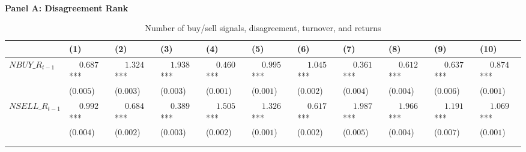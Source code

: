 
\begin{landscape}
\begin{table}



\caption[NBUY/NSELL, Disagreement, Turnover, and Returns]{\label{tab:num_buy_sell_reg}Number of buy/sell signals, disagreement, turnover, and returns}
\centering
\fontsize{9}{11}\selectfont
\begin{threeparttable}
\phantom{ }\\
\textbf{Panel A: Disagreement Rank}
\begin{tabular}[t]{>{\raggedright\arraybackslash}p{2.8cm}>{\raggedright\arraybackslash}p{1.7cm}>{\raggedright\arraybackslash}p{1.7cm}>{\raggedright\arraybackslash}p{1.7cm}>{\raggedright\arraybackslash}p{1.7cm}>{\raggedright\arraybackslash}p{1.7cm}>{\raggedright\arraybackslash}p{1.7cm}>{\raggedright\arraybackslash}p{1.7cm}>{\raggedright\arraybackslash}p{1.7cm}>{\raggedright\arraybackslash}p{1.7cm}>{\raggedright\arraybackslash}p{1.7cm}}
\toprule
 & \phantom{-}(1) & \phantom{-}(2) & \phantom{-}(3) & \phantom{-}(4) & \phantom{-}(5) & \phantom{-}(6) & \phantom{-}(7) & \phantom{-}(8) & \phantom{-}(9) & \phantom{-}(10)\\
\midrule
$NBUY\_R_{t-1}$ & $\phantom{-}0.687$*** & $\phantom{-}1.324$*** & $\phantom{-}1.938$*** & $\phantom{-}0.460$*** & $\phantom{-}0.995$*** & $\phantom{-}1.045$*** & $\phantom{-}0.361$*** & $\phantom{-}0.612$*** & $\phantom{-}0.637$*** & $\phantom{-}0.874$***\\
 & (\phantom{-}$0.005$) & (\phantom{-}$0.003$) & (\phantom{-}$0.003$) & (\phantom{-}$0.001$) & (\phantom{-}$0.001$) & (\phantom{-}$0.002$) & (\phantom{-}$0.004$) & (\phantom{-}$0.004$) & (\phantom{-}$0.006$) & (\phantom{-}$0.001$)\\
\addlinespace
$NSELL\_R_{t-1}$ & $\phantom{-}0.992$*** & $\phantom{-}0.684$*** & $\phantom{-}0.389$*** & $\phantom{-}1.505$*** & $\phantom{-}1.326$*** & $\phantom{-}0.617$*** & $\phantom{-}1.987$*** & $\phantom{-}1.966$*** & $\phantom{-}1.191$*** & $\phantom{-}1.069$***\\
 & (\phantom{-}$0.004$) & (\phantom{-}$0.002$) & (\phantom{-}$0.003$) & (\phantom{-}$0.002$) & (\phantom{-}$0.001$) & (\phantom{-}$0.002$) & (\phantom{-}$0.005$) & (\phantom{-}$0.004$) & (\phantom{-}$0.007$) & (\phantom{-}$0.001$)\\
 &  &  &  &  &  &  &  &  &  \vphantom{1} & \\
\midrule
 &  &  &  &  &  &  &  &  &  & \\

\end{tabular}
\end{threeparttable}
\end{table}
\end{landscape}
